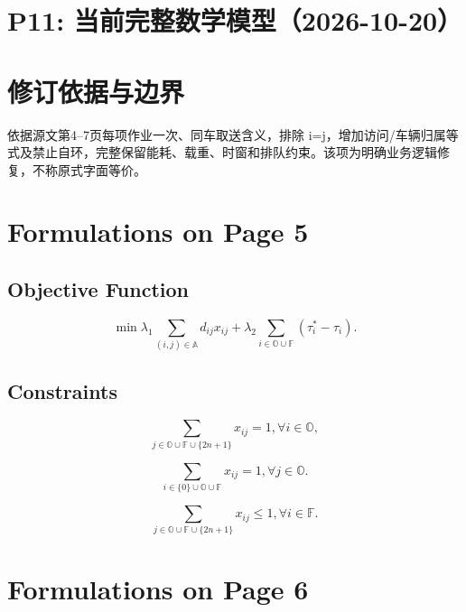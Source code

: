 \documentclass[11pt]{ctexart}
\begin{document}
\section*{P11: 当前完整数学模型（2026-10-20）}
\section*{修订依据与边界}依据源文第4–7页每项作业一次、同车取送含义，排除 i=j，增加访问/车辆归属等式及禁止自环，完整保留能耗、载重、时窗和排队约束。该项为明确业务逻辑修复，不称原式字面等价。




\section{Formulations on Page 5}

\subsection{Objective Function}
\begin{equation}
    \label{eq:1}
    \min \lambda_1 \sum_{(i,j) \in \mathbb{A}} d_{ij}x_{ij} + \lambda_2 \sum_{i \in \mathbb{O} \cup \mathbb{F}} (\tau_i^* - \tau_i). \tag{1}
\end{equation}

\subsection{Constraints}
\begin{equation}
    \label{eq:2}
    \sum_{j \in \mathbb{O} \cup \mathbb{F} \cup \{2n+1\}} x_{ij} = 1, \forall i \in \mathbb{O}, \tag{2}
\end{equation}

\begin{equation}
    \label{eq:3}
    \sum_{i \in \{0\} \cup \mathbb{O} \cup \mathbb{F}} x_{ij} = 1, \forall j \in \mathbb{O}. \tag{3}
\end{equation}

\begin{equation}
    \label{eq:4}
    \sum_{j \in \mathbb{O} \cup \mathbb{F} \cup \{2n+1\}} x_{ij} \le 1, \forall i \in \mathbb{F}. \tag{4}
\end{equation}

\newpage

\section{Formulations on Page 6}
\end{document}
